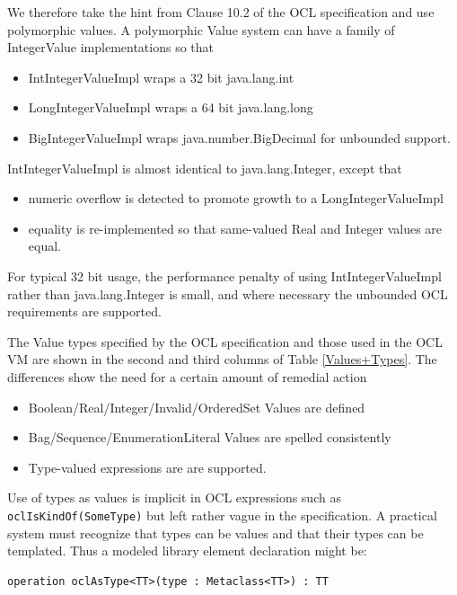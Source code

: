 \documentclass{sig-alternate}
\begin{document}
We therefore take the hint from Clause 10.2 of the OCL specification and use polymorphic values.
A polymorphic Value system can have a family of IntegerValue implementations so that
 \begin{itemize}
\item IntIntegerValueImpl wraps a 32 bit java.lang.int
\item LongIntegerValueImpl wraps a 64 bit java.lang.long 
\item BigIntegerValueImpl wraps java.number.BigDecimal \linebreak for unbounded support.
\end{itemize}
IntIntegerValueImpl is almost identical to java.lang.Integer, except that 
\begin{itemize}
\item numeric overflow is detected to promote growth to a LongIntegerValueImpl
\item equality is re-implemented so that same-valued Real and Integer values are equal.
\end{itemize}
For typical 32 bit usage, the performance penalty of using IntIntegerValueImpl rather than java.lang.Integer is small, and where necessary the unbounded OCL requirements are supported.

The Value types specified by the OCL specification and those used in the OCL VM are shown in the second and third columns of Table \ref{Values+Types}. The differences show the need for a certain amount of remedial action
\begin{itemize}
\item Boolean/Real/Integer/Invalid/OrderedSet Values are defined
\item Bag/Sequence/EnumerationLiteral Values are spelled consistently 
\item Type-valued expressions are are supported.
\end{itemize}

Use of types as values is implicit in OCL expressions such as \verb|oclIsKindOf(SomeType)| but left rather vague in the specification. A practical system must recognize that types can be values and that their types can be templated. Thus a modeled
library element declaration\cite{OCL-stdlib} might be:
\begin{verbatim}
operation oclAsType<TT>(type : Metaclass<TT>) : TT
\end{verbatim}
\end{document}
